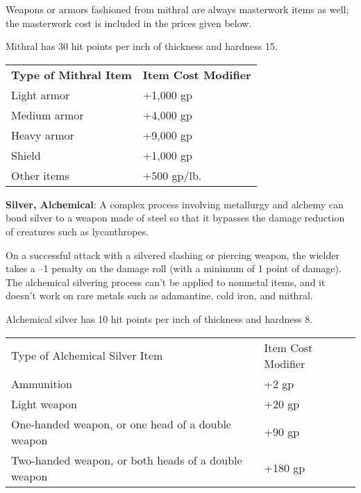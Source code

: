 Weapons or armors fashioned from mithral are always masterwork items as well; the masterwork cost is included in the prices given below.
	
Mithral has 30 hit points per inch of thickness and hardness 15.
			
\begin{table}
\sffamily
 \begin{tabular}{ll}
\textbf{Type of Mithral Item} & \textbf{Item Cost Modifier}\\
Light armor & +1,000 gp\\
Medium armor & +4,000 gp\\
Heavy armor & +9,000 gp\\
Shield & +1,000 gp\\
Other items & +500 gp/lb.\\
 \end{tabular}
\end{table}
		
\textbf{Silver, Alchemical}: A complex process involving metallurgy and alchemy can bond silver to a weapon made of steel so that it bypasses the damage reduction of creatures such as lycanthropes.
	
On a successful attack with a silvered slashing or piercing weapon, the wielder takes a --1 penalty on the damage roll (with a minimum of 1 point of damage). The alchemical silvering process can't be applied to nonmetal items, and it doesn't work on rare metals such as adamantine, cold iron, and mithral.
	
Alchemical silver has 10 hit points per inch of thickness and hardness 8.
			
\begin{table}
 \sffamily
 \begin{tabular}{ll}
  Type of Alchemical Silver Item & Item Cost Modifier \\
  Ammunition & +2 gp\\
  Light weapon & +20 gp\\
  One-handed weapon, or one head of a double weapon & +90 gp \\
  Two-handed weapon, or both heads of a double weapon & +180 gp 
 \end{tabular}
\end{table}
	
